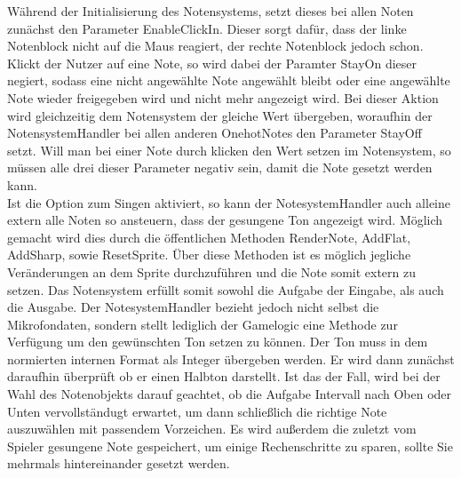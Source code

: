 Während der Initialisierung des Notensystems, setzt dieses bei allen Noten zunächst den Parameter EnableClickIn. Dieser sorgt dafür, dass der linke Notenblock nicht auf die Maus reagiert, der rechte Notenblock jedoch schon. Klickt der Nutzer auf eine Note, so wird dabei der Paramter StayOn dieser negiert, sodass eine nicht angewählte Note angewählt bleibt oder eine angewählte Note wieder freigegeben wird und nicht mehr angezeigt wird. Bei dieser Aktion wird gleichzeitig dem Notensystem der gleiche Wert übergeben, woraufhin der NotensystemHandler bei allen anderen OnehotNotes den Parameter StayOff setzt. Will man bei einer Note durch klicken den Wert setzen im Notensystem, so müssen alle drei dieser Parameter negativ sein, damit die Note gesetzt werden kann. \\
Ist die Option zum Singen aktiviert, so kann der NotesystemHandler auch alleine extern alle Noten so ansteuern, dass der gesungene Ton angezeigt wird. Möglich gemacht wird dies durch die öffentlichen Methoden RenderNote, AddFlat, AddSharp, sowie ResetSprite. Über diese Methoden ist es möglich jegliche Veränderungen an dem Sprite durchzuführen und die Note somit extern zu setzen. Das Notensystem erfüllt somit sowohl die Aufgabe der Eingabe, als auch die Ausgabe. Der NotesystemHandler bezieht jedoch nicht selbst die Mikrofondaten, sondern stellt lediglich der Gamelogic eine Methode zur Verfügung um den gewünschten Ton setzen zu können. Der Ton muss in dem normierten internen Format als Integer übergeben werden. Er wird dann zunächst daraufhin überprüft ob er einen Halbton darstellt. Ist das der Fall, wird bei der Wahl des Notenobjekts darauf geachtet, ob die Aufgabe Intervall nach Oben oder Unten vervollständugt erwartet, um dann schließlich die richtige Note auszuwählen mit passendem Vorzeichen. Es wird außerdem die zuletzt vom Spieler gesungene Note gespeichert, um einige Rechenschritte zu sparen, sollte Sie mehrmals hintereinander gesetzt werden. 


